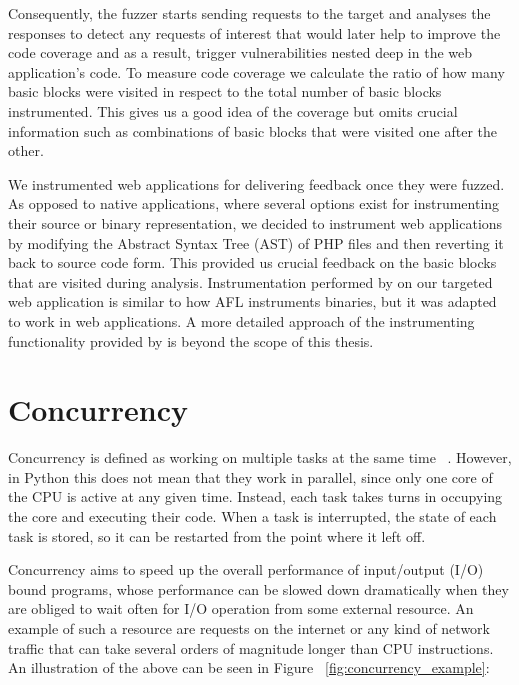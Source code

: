 Consequently, the fuzzer starts sending requests to the target and analyses the responses to detect any requests of interest that would later help to improve the code coverage and as a result, trigger vulnerabilities nested deep in the web application's code. To measure code coverage we calculate the ratio of how many basic blocks were visited in respect to the total number of basic blocks instrumented. This gives us a good idea of the coverage but omits crucial information such as combinations of basic blocks that were visited one after the other.

We instrumented web applications for delivering feedback once they were fuzzed. As opposed to native applications, where several options exist for instrumenting their source or binary
representation, we decided to instrument web applications by modifying the Abstract Syntax Tree (AST) of PHP files and then reverting it back to source code form. This provided us crucial feedback on the basic blocks that are visited during analysis. Instrumentation performed by \pname on our targeted web application is similar to how AFL instruments binaries, but it was adapted to work in web applications. A more detailed approach of the instrumenting functionality provided by \pname is beyond the scope of this thesis.

\section{Concurrency}
Concurrency is defined as working on multiple tasks at the same time ~\cite{concurrency_realpython}. However, in Python this does not mean that they work in parallel, since only one core of the CPU is active at any given time. Instead, each task takes turns in occupying the core and executing their code. When a task is interrupted, the state of each task is stored, so it can be restarted from the point where it left off. 

Concurrency aims to speed up the overall performance of input/output (I/O) bound programs, whose performance can be slowed down dramatically when they are obliged to wait often for I/O operation from some external resource. An example of such a resource are requests on the internet or any kind of network traffic that can take several orders of magnitude longer than CPU instructions. An illustration of the above can be seen in Figure ~\ref{fig:concurrency_example}:

